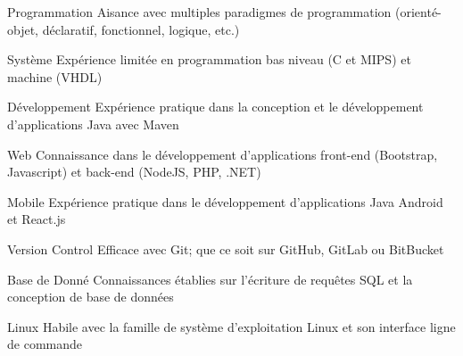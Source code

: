 

\begin{cvskills}

    
  \cvskill
    {Programmation} %
    {Aisance avec multiples paradigmes de programmation (orienté-objet, déclaratif, fonctionnel, logique, etc.)}

  \cvskill
    {Système} %
    {Expérience limitée en programmation bas niveau (C et MIPS) et machine (VHDL)}

  \cvskill
    {Développement} %
    {Expérience pratique dans la conception et le développement d'applications Java avec Maven}
    
  \cvskill
    {Web} %
    {Connaissance dans le développement d'applications front-end (Bootstrap, Javascript) et back-end (NodeJS, PHP, .NET)}
  
  \cvskill
    {Mobile} %
    {Expérience pratique dans le développement d'applications Java Android et React.js}
    
  \cvskill
    {Version Control} %
    {Efficace avec Git; que ce soit sur GitHub, GitLab ou BitBucket}
    
  \cvskill
    {Base de Donné} %
    {Connaissances établies sur l'écriture de requêtes SQL et la conception de base de données}
    
  \cvskill
    {Linux} %
    {Habile avec la famille de système d'exploitation Linux et son interface ligne de commande}

\end{cvskills}
